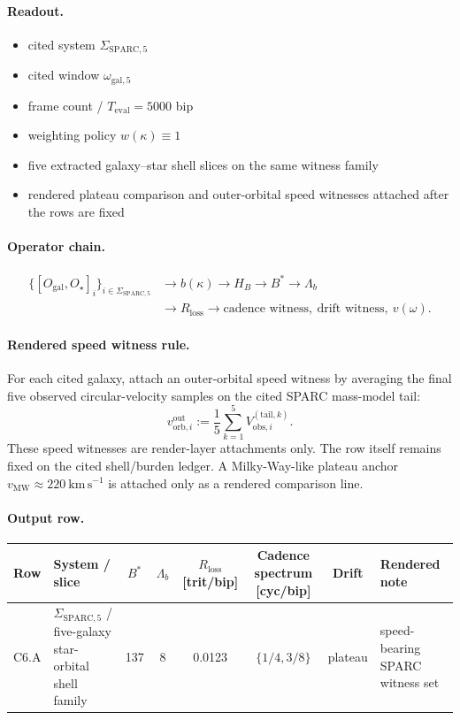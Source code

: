 \paragraph{Readout.}
\begin{itemize}
\item cited system $\Sigma_{\mathrm{SPARC},5}$
\item cited window $\omega_{\mathrm{gal},5}$
\item frame count / $T_{\mathrm{eval}}=5000$ bip
\item weighting policy $w(\kappa)\equiv 1$
\item five extracted galaxy--star shell slices on the same witness family
\item rendered plateau comparison and outer-orbital speed witnesses attached after the rows are fixed
\end{itemize}

\paragraph{Operator chain.}
\[
\begin{aligned}
\{[O_{\mathrm{gal}},O_{\star}]_i\}_{i\in\Sigma_{\mathrm{SPARC},5}}
&\to b(\kappa) \to H_B \to B^* \to \Lambda_b \\
&\to R_{\mathrm{loss}} \to \text{cadence witness},\ \text{drift witness},\ v(\omega).
\end{aligned}
\]

\paragraph{Rendered speed witness rule.}
For each cited galaxy, attach an outer-orbital speed witness by averaging the final five observed circular-velocity samples on the cited SPARC mass-model tail:
\[
v^{\mathrm{out}}_{\mathrm{orb},i}
:=
\frac{1}{5}\sum_{k=1}^{5} V^{(\mathrm{tail},k)}_{\mathrm{obs},i}.
\]
These speed witnesses are render-layer attachments only. The row itself remains fixed on the cited shell/burden ledger. A Milky-Way-like plateau anchor $v_{\mathrm{MW}}\approx220\ \mathrm{km\,s^{-1}}$ is attached only as a rendered comparison line.


\paragraph{Output row.}
\begin{center}
\footnotesize
\begin{tabularx}{\linewidth}{@{}lXcccccX@{}}
\toprule
Row & System / slice & $B^*$ & $\Lambda_b$ & $R_{\mathrm{loss}}$ [trit/bip] & Cadence spectrum [cyc/bip] & Drift & Rendered note \\
\midrule
C6.A & $\Sigma_{\mathrm{SPARC},5}$ / five-galaxy star-orbital shell family & 137 & 8 & 0.0123 & $\{1/4,3/8\}$ & plateau & speed-bearing SPARC witness set \\
\bottomrule
\end{tabularx}
\end{center}


